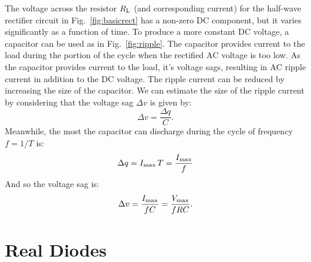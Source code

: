 \documentclass[12pt,oneside]{book}
\begin{document}
The voltage across the resistor $R_{\rm L}$ (and corresponding current) for the half-wave rectifier circuit in Fig.~\ref{fig:basicrect} has a non-zero DC component, but it varies significantly as a function of time.  To produce a more constant DC voltage, a capacitor can be used as in Fig.~\ref{fig:ripple}.  The capacitor provides current to the load during the portion of the cycle when the rectified AC voltage is too low.
As the capacitor provides current to the load, it's voltage sags, resulting in AC ripple current in addition to the DC voltage.  The ripple current can be reduced by increasing the size of the capacitor.  We can estimate the size of the ripple current by considering that the voltage sag $\Delta v$ is given by:
\begin{displaymath}
\Delta v = \frac{\Delta q}{C}.
\end{displaymath}
Meanwhile, the most the capacitor can discharge during the cycle of frequency $f=1/T$ is:
\begin{displaymath}
\Delta q = I_{\rm max} \, T = \frac{I_{\rm max}}{f}  
\end{displaymath}
And so the voltage sag is:
\begin{displaymath}
\Delta v = \frac{I_{\rm max}}{fC} = \frac{V_{\rm max}}{fRC}.
\end{displaymath}

\section{Real Diodes}
\end{document}
